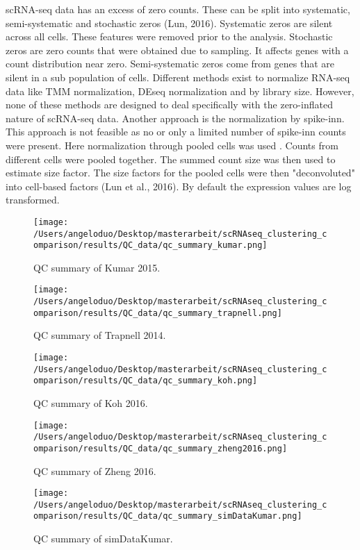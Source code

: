 \documentclass[11pt, a4paper]{article}\usepackage[]{graphicx}\usepackage[]{color}
\begin{document}
scRNA-seq data has an excess of zero counts. These can be split into systematic, semi-systematic and stochastic zeros (Lun, 2016). Systematic zeros are silent across all cells. These features were removed prior to the analysis. Stochastic zeros are zero counts that were obtained due to sampling. It affects genes with a count distribution near zero. Semi-systematic zeros come from genes that are silent in a sub population of cells. Different methods exist to normalize RNA-seq data like TMM normalization, DEseq normalization and by library size. However, none of these methods are designed to deal specifically with the zero-inflated nature of scRNA-seq data.
Another approach is the normalization by spike-inn. This approach is not feasible as no or only a limited number of spike-inn counts were present.  Here normalization through pooled cells was used \citet{lun2016pooling}. Counts from different cells were pooled together. The summed count size was then used to estimate size factor. The size factors for the pooled cells were then  "deconvoluted" into cell-based factors (Lun et al., 2016). By default the expression values are log transformed.


\begin{figure}[!h]
\texttt{[image: /Users/angeloduo/Desktop/masterarbeit/scRNAseq\_clustering\_comparison/results/QC\_data/qc\_summary\_kumar.png]}
\caption{QC summary of Kumar 2015. }
\label{fig:qckumar}
\end{figure}

\begin{figure}[!h]
\texttt{[image: /Users/angeloduo/Desktop/masterarbeit/scRNAseq\_clustering\_comparison/results/QC\_data/qc\_summary\_trapnell.png]}
\caption{QC summary of Trapnell 2014. }
\label{fig:qctrapnell}
\end{figure}

\begin{figure}[!h]
\texttt{[image: /Users/angeloduo/Desktop/masterarbeit/scRNAseq\_clustering\_comparison/results/QC\_data/qc\_summary\_koh.png]}
\caption{QC summary of Koh 2016. }
\label{fig:qckoh}
\end{figure}

\begin{figure}[!h]
\texttt{[image: /Users/angeloduo/Desktop/masterarbeit/scRNAseq\_clustering\_comparison/results/QC\_data/qc\_summary\_zheng2016.png]}
\caption{QC summary of Zheng 2016. }
\label{fig:qczheng}
\end{figure}

\begin{figure}[!h]
\texttt{[image: /Users/angeloduo/Desktop/masterarbeit/scRNAseq\_clustering\_comparison/results/QC\_data/qc\_summary\_simDataKumar.png]}
\caption{QC summary of simDataKumar. }
\label{fig:simDataKumar}
\end{figure}
\end{document}
